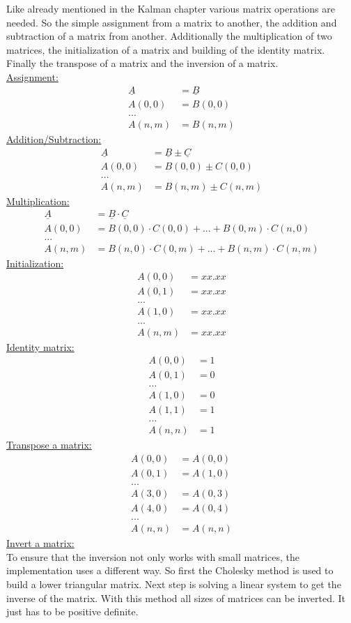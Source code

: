 Like already mentioned in the Kalman chapter various matrix operations are needed. So the simple assignment from a matrix to another, the addition and subtraction of a matrix from another. Additionally the multiplication of two matrices, the initialization of a matrix and building of the identity matrix. Finally the transpose of a matrix and the inversion of a matrix.\\
\underline{Assignment:}
\begin{align}		
\underline A&=\underline B\\
A(0,0)&=B(0,0)\\
...\\
A(n,m)&=B(n,m)
\end{align}
\underline{Addition/Subtraction:}
\begin{align}		
\underline A&=\underline B \pm \underline C\\
A(0,0)&=B(0,0)\pm C(0,0)\\
...\\
A(n,m)&=B(n,m)\pm C(n,m)
\end{align}
\underline{Multiplication:}
\begin{align}		
\underline A&=\underline B \cdot \underline C\\
A(0,0)&=B(0,0)\cdot C(0,0)+...+B(0,m)\cdot C(n,0)\\
...\\
A(n,m)&=B(n,0)\cdot C(0,m)+...+B(n,m)\cdot C(n,m)
\end{align}
\underline{Initialization:}
\begin{align}		
A(0,0)&=xx.xx\\
A(0,1)&=xx.xx\\
...\\
A(1,0)&=xx.xx\\
...\\
A(n,m)&=xx.xx
\end{align}
\underline{Identity matrix:}
\begin{align}		
A(0,0)&=1\\
A(0,1)&=0\\
...\\
A(1,0)&=0\\
A(1,1)&=1\\
...\\
A(n,n)&=1
\end{align}
\underline{Transpose a matrix:}
\begin{align}		
A(0,0)&=A(0,0)\\
A(0,1)&=A(1,0)\\
...\\
A(3,0)&=A(0,3)\\
A(4,0)&=A(0,4)\\
...\\
A(n,n)&=A(n,n)
\end{align}
\underline{Invert a matrix:}\\
To ensure that the inversion not only works with small matrices, the implementation uses a different way. So first the Cholesky method is used to build a lower triangular matrix. Next step is solving a linear system to get the inverse of the matrix. With this method all sizes of matrices can be inverted. It just has to be positive definite.

